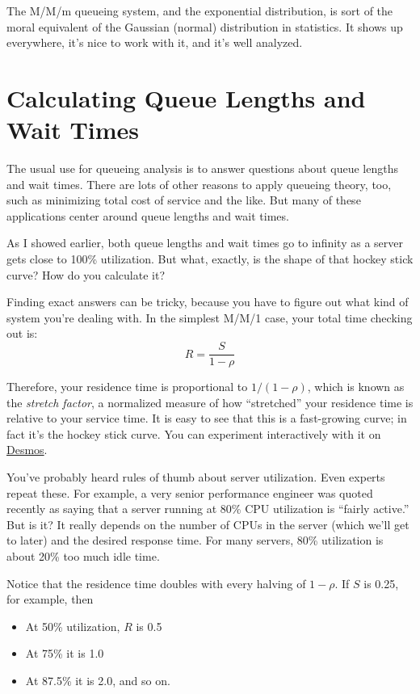 \documentclass{vivid_layout}
\begin{document}
The M/M/m queueing system, and the exponential distribution, is sort of the moral equivalent of the Gaussian (normal) distribution in statistics. It shows up everywhere, it's nice to work with it, and it's well analyzed.

\section{Calculating Queue Lengths and Wait Times}

The usual use for queueing analysis is to answer questions about queue lengths and wait times. There are lots of other reasons to apply queueing theory, too, such as minimizing total cost of service and the like. But many of these applications center around queue lengths and wait times.

As I showed earlier, both queue lengths and wait times go to infinity as a server gets close to 100\% utilization. But what, exactly, is the shape of that hockey stick curve? How do you calculate it?

Finding exact answers can be tricky, because you have to figure out what kind of system you're dealing with. In the simplest M/M/1 case, your total time checking out is:
\[
  R = \frac{S}{1 - \rho}
\]

Therefore, your residence time is proportional to \( 1/(1-\rho) \), which is known as the {\itshape stretch factor}, a normalized measure of how ``stretched'' your residence time is relative to your service time. It is easy to see that this is a fast-growing curve; in fact it's the hockey stick curve. You can experiment interactively with it on \href{https://www.desmos.com/calculator/vhvwh6vjo7}{Desmos}.

You've probably heard rules of thumb
about server utilization. Even experts repeat these. For example, a very senior
performance engineer was quoted recently as saying that a server running at 80\%
CPU utilization is ``fairly active.'' But is it? It really depends on the number of
CPUs in the server (which we'll get to later) and the desired response time. For
many servers, 80\% utilization is about 20\% too much idle time.

Notice that the residence time doubles with every halving of \( 1-\rho \). If $S$ is 0.25, for example, then

\begin{itemize}
\item At 50\% utilization, \( R \) is 0.5
\item At 75\% it is 1.0
\item At 87.5\% it is 2.0, and so on.
\end{itemize}
\end{document}
